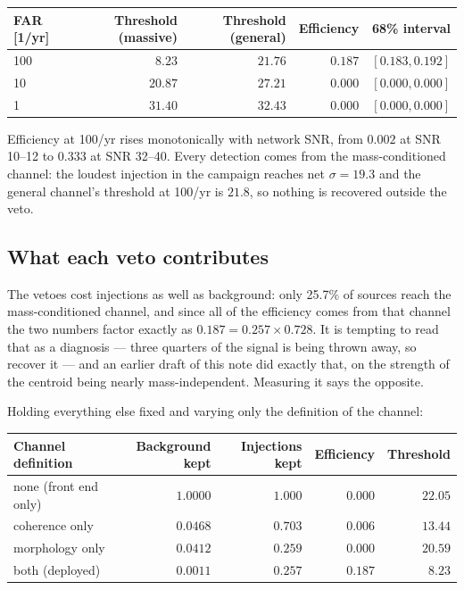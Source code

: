 \documentclass[11pt]{article}
\begin{document}
\begin{center}
\begin{tabular}{lrrrr}
\toprule
FAR [1/yr] & Threshold (massive) & Threshold (general) & Efficiency & 68\% interval \\
\midrule
100 & $8.23$  & $21.76$ & $\mathbf{0.187}$ & $[0.183, 0.192]$ \\
10  & $20.87$ & $27.21$ & $0.000$ & $[0.000, 0.000]$ \\
1   & $31.40$ & $32.43$ & $0.000$ & $[0.000, 0.000]$ \\
\bottomrule
\end{tabular}
\end{center}

Efficiency at 100/yr rises monotonically with network SNR, from $0.002$ at SNR 10--12 to
$0.333$ at SNR 32--40. Every detection comes from the mass-conditioned channel: the
loudest injection in the campaign reaches net $\sigma = 19.3$ and the general channel's
threshold at 100/yr is $21.8$, so nothing is recovered outside the veto.

\subsection*{What each veto contributes}

The vetoes cost injections as well as background: only 25.7\% of sources reach the
mass-conditioned channel, and since all of the efficiency comes from that channel the
two numbers factor exactly as $0.187 = 0.257 \times 0.728$. It is tempting to read that
as a diagnosis --- three quarters of the signal is being thrown away, so recover it ---
and an earlier draft of this note did exactly that, on the strength of the centroid being
nearly mass-independent. Measuring it says the opposite.

Holding everything else fixed and varying only the definition of the channel:

\begin{center}
\begin{tabular}{lrrrr}
\toprule
Channel definition & Background kept & Injections kept & Efficiency & Threshold \\
\midrule
none (front end only) & $1.0000$ & $1.000$ & $0.000$ & $22.05$ \\
coherence only        & $0.0468$ & $0.703$ & $0.006$ & $13.44$ \\
morphology only       & $0.0412$ & $0.259$ & $0.000$ & $20.59$ \\
both (deployed)       & $0.0011$ & $0.257$ & $\mathbf{0.187}$ & $8.23$ \\
\bottomrule
\end{tabular}
\end{center}
\end{document}
